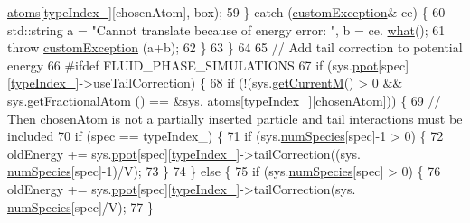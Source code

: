 \begin{DoxyCode}
      \hyperlink{classsim_system_a90421b19082f7fb8fc23b7264b1161e4}{atoms}[\hyperlink{classmc_move_acb731965547b0326ef318ec96da8b46a}{typeIndex\_}][chosenAtom], box);
59             \} \textcolor{keywordflow}{catch} (\hyperlink{classcustom_exception}{customException}& ce) \{
60                 std::string a = \textcolor{stringliteral}{"Cannot translate because of energy error: "}, b = ce.
      \hyperlink{classcustom_exception_aeb6ab5848b038adfc68fde86a512f691}{what}();
61                 \textcolor{keywordflow}{throw} \hyperlink{classcustom_exception}{customException} (a+b);
62             \}
63         \}
64 
65         \textcolor{comment}{// Add tail correction to potential energy}
66 \textcolor{preprocessor}{#ifdef FLUID\_PHASE\_SIMULATIONS}
67 \textcolor{preprocessor}{}        \textcolor{keywordflow}{if} (sys.\hyperlink{classsim_system_ad2e290b5963f132e6a3a56cee35c8e9f}{ppot}[spec][\hyperlink{classmc_move_acb731965547b0326ef318ec96da8b46a}{typeIndex\_}]->useTailCorrection) \{
68             \textcolor{keywordflow}{if} (!(sys.\hyperlink{classsim_system_a299fe4372e610b554eaaf5f5957b2dbc}{getCurrentM}() > 0 && sys.\hyperlink{classsim_system_a2ab77377c60e0e3109a6e875690b0ab7}{getFractionalAtom} () == &sys.
      \hyperlink{classsim_system_a90421b19082f7fb8fc23b7264b1161e4}{atoms}[\hyperlink{classmc_move_acb731965547b0326ef318ec96da8b46a}{typeIndex\_}][chosenAtom])) \{
69                 \textcolor{comment}{// Then chosenAtom is not a partially inserted particle and tail interactions must be
       included}
70                 \textcolor{keywordflow}{if} (spec == typeIndex\_) \{
71                     \textcolor{keywordflow}{if} (sys.\hyperlink{classsim_system_a9eea865e6dc1cff377b1e79c4d9c23f0}{numSpecies}[spec]-1 > 0) \{
72                         oldEnergy += sys.\hyperlink{classsim_system_ad2e290b5963f132e6a3a56cee35c8e9f}{ppot}[spec][\hyperlink{classmc_move_acb731965547b0326ef318ec96da8b46a}{typeIndex\_}]->tailCorrection((sys.
      \hyperlink{classsim_system_a9eea865e6dc1cff377b1e79c4d9c23f0}{numSpecies}[spec]-1)/V);
73                     \}
74                 \} \textcolor{keywordflow}{else} \{
75                     \textcolor{keywordflow}{if} (sys.\hyperlink{classsim_system_a9eea865e6dc1cff377b1e79c4d9c23f0}{numSpecies}[spec] > 0) \{
76                         oldEnergy += sys.\hyperlink{classsim_system_ad2e290b5963f132e6a3a56cee35c8e9f}{ppot}[spec][\hyperlink{classmc_move_acb731965547b0326ef318ec96da8b46a}{typeIndex\_}]->tailCorrection(sys.
      \hyperlink{classsim_system_a9eea865e6dc1cff377b1e79c4d9c23f0}{numSpecies}[spec]/V);
77                     \}

\end{DoxyCode}
